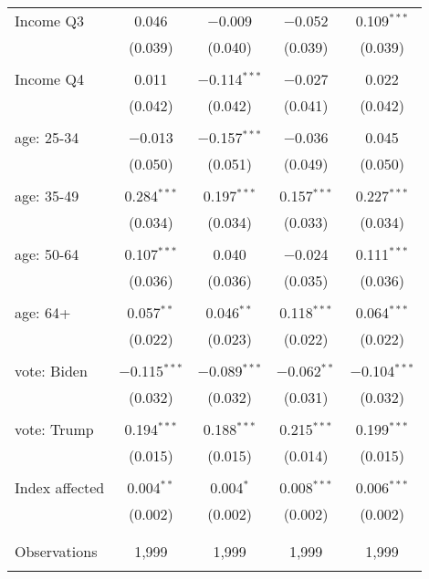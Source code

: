 \begin{tabular}{@{\extracolsep{5pt}}lcccc}
 Income Q3 & 0.046 & $-$0.009 & $-$0.052 & 0.109$^{***}$ \\ 
  & (0.039) & (0.040) & (0.039) & (0.039) \\ 
  & & & & \\ 
 Income Q4 & 0.011 & $-$0.114$^{***}$ & $-$0.027 & 0.022 \\ 
  & (0.042) & (0.042) & (0.041) & (0.042) \\ 
  & & & & \\ 
 age: 25-34 & $-$0.013 & $-$0.157$^{***}$ & $-$0.036 & 0.045 \\ 
  & (0.050) & (0.051) & (0.049) & (0.050) \\ 
  & & & & \\ 
 age: 35-49 & 0.284$^{***}$ & 0.197$^{***}$ & 0.157$^{***}$ & 0.227$^{***}$ \\ 
  & (0.034) & (0.034) & (0.033) & (0.034) \\ 
  & & & & \\ 
 age: 50-64 & 0.107$^{***}$ & 0.040 & $-$0.024 & 0.111$^{***}$ \\ 
  & (0.036) & (0.036) & (0.035) & (0.036) \\ 
  & & & & \\ 
 age: 64+ & 0.057$^{**}$ & 0.046$^{**}$ & 0.118$^{***}$ & 0.064$^{***}$ \\ 
  & (0.022) & (0.023) & (0.022) & (0.022) \\ 
  & & & & \\ 
 vote: Biden & $-$0.115$^{***}$ & $-$0.089$^{***}$ & $-$0.062$^{**}$ & $-$0.104$^{***}$ \\ 
  & (0.032) & (0.032) & (0.031) & (0.032) \\ 
  & & & & \\ 
 vote: Trump & 0.194$^{***}$ & 0.188$^{***}$ & 0.215$^{***}$ & 0.199$^{***}$ \\ 
  & (0.015) & (0.015) & (0.014) & (0.015) \\ 
  & & & & \\ 
 Index affected & 0.004$^{**}$ & 0.004$^{*}$ & 0.008$^{***}$ & 0.006$^{***}$ \\ 
  & (0.002) & (0.002) & (0.002) & (0.002) \\ 
  & & & & \\ 
\hline \\[-1.8ex] 

Observations & 1,999 & 1,999 & 1,999 & 1,999 \\ 
\hline 
\hline \\[-1.8ex] 
\end{tabular} 